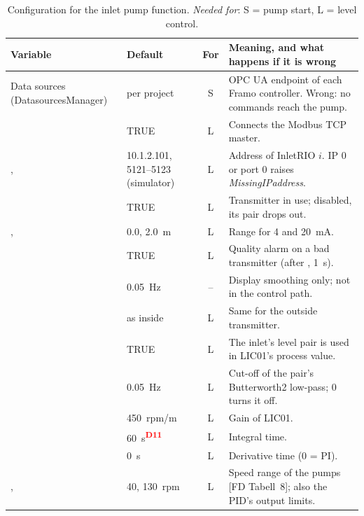\documentclass[11pt]{article}
\newcommand{\dev}[1]{\textsuperscript{\textcolor{red}{\textbf{D#1}}}}
\begin{document}
\begin{table}[htbp]
\centering\small
\caption{Configuration for the inlet pump function. \emph{Needed for}: S = pump start,
L = level control.}
\label{tab:config}
\begin{tabularx}{\textwidth}{@{}P{58mm}P{30mm}cL@{}}
\toprule
Variable & Default & For & Meaning, and what happens if it is wrong \\
\midrule
Data sources  (DatasourcesManager) & per project & S &
  OPC UA endpoint of each Framo controller. Wrong: no commands reach the pump. \\
 & TRUE & L & Connects the Modbus TCP master. \\
,  & 10.1.2.101, 5121--5123 (simulator) & L &
  Address of InletRIO $i$. IP 0 or port 0 raises \emph{MissingIPaddress}. \\
 & TRUE & L &
  Transmitter in use; disabled, its pair drops out. \\
,  & 0.0, 2.0~m & L &
  Range for 4 and 20~mA. \\
 & TRUE & L &
  Quality alarm on a bad transmitter (after , 1~s). \\
 & 0.05~Hz & -- &
  Display smoothing only; not in the control path. \\
 & as inside & L & Same for the outside transmitter. \\
 & TRUE & L &
  The inlet's level pair is used in LIC01's process value. \\
 & 0.05~Hz & L &
  Cut-off of the pair's Butterworth2 low-pass; 0 turns it off. \\
 & 450~rpm/m & L & Gain of LIC01. \\
 & 60~s\dev{11} & L & Integral time. \\
 & 0~s & L & Derivative time (0 = PI). \\
,  & 40, 130~rpm & L &
  Speed range of the pumps [FD Tabell~8]; also the PID's output limits. \\

\end{tabularx}
\end{table}
\end{document}

